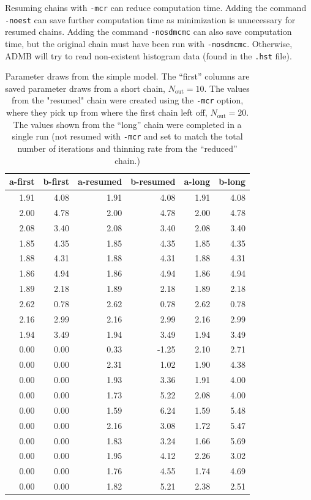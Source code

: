 \documentclass{article}\usepackage[]{graphicx}\usepackage[]{color}
\begin{document}
Resuming chains with \texttt{-mcr} can reduce computation time. Adding the
command \texttt{-noest} can save further computation time as minimization
is unnecessary for resumed chains. Adding the command \texttt{-nosdmcmc}
can also save computation time, but the original chain must have been run
with \texttt{-nosdmcmc}. Otherwise, ADMB will try to read non-existent
histogram data (found in the \texttt{.hst} file).

\begin{table}[ht]
\centering
\begin{tabular}{rrrrrr}
  \hline
  a-first & b-first & a-resumed & b-resumed & a-long & b-long \\
  \hline
  1.91 & 4.08 & 1.91 & 4.08 & 1.91 & 4.08 \\
  2.00 & 4.78 & 2.00 & 4.78 & 2.00 & 4.78 \\
  2.08 & 3.40 & 2.08 & 3.40 & 2.08 & 3.40 \\
  1.85 & 4.35 & 1.85 & 4.35 & 1.85 & 4.35 \\
  1.88 & 4.31 & 1.88 & 4.31 & 1.88 & 4.31 \\
  1.86 & 4.94 & 1.86 & 4.94 & 1.86 & 4.94 \\
  1.89 & 2.18 & 1.89 & 2.18 & 1.89 & 2.18 \\
  2.62 & 0.78 & 2.62 & 0.78 & 2.62 & 0.78 \\
  2.16 & 2.99 & 2.16 & 2.99 & 2.16 & 2.99 \\
  1.94 & 3.49 & 1.94 & 3.49 & 1.94 & 3.49 \\
  0.00 & 0.00 & 0.33 & -1.25 & 2.10 & 2.71 \\
  0.00 & 0.00 & 2.31 & 1.02 & 1.90 & 4.38 \\
  0.00 & 0.00 & 1.93 & 3.36 & 1.91 & 4.00 \\
  0.00 & 0.00 & 1.73 & 5.22 & 2.08 & 4.00 \\
  0.00 & 0.00 & 1.59 & 6.24 & 1.59 & 5.48 \\
  0.00 & 0.00 & 2.16 & 3.08 & 1.72 & 5.47 \\
  0.00 & 0.00 & 1.83 & 3.24 & 1.66 & 5.69 \\
  0.00 & 0.00 & 1.95 & 4.12 & 2.26 & 3.02 \\
  0.00 & 0.00 & 1.76 & 4.55 & 1.74 & 4.69 \\
  0.00 & 0.00 & 1.82 & 5.21 & 2.38 & 2.51 \\
   \hline
\end{tabular}
\caption{Parameter draws from the simple model. The ``first'' columns are saved
parameter draws from a short chain, $N_\text{out}=10$. The values from the "resumed" chain
were created using the \texttt{-mcr} option, where they pick up from where the
first chain left off, $N_\text{out}=20$. The values shown from the ``long'' chain
were completed in a single run (not resumed with \texttt{-mcr} and set to match
the total number of iterations and thinning rate from the ``reduced'' chain.)}
\label{tab:mcr}
\end{table}
\end{document}
